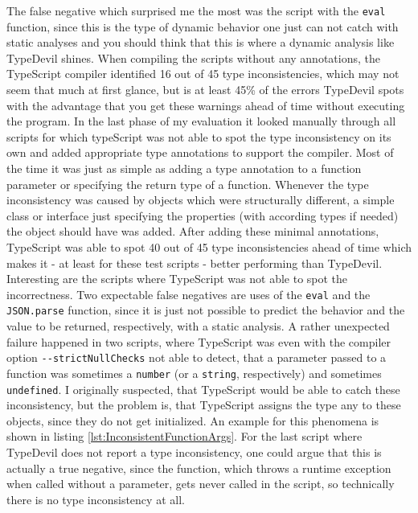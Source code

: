 \documentclass[runningheads,a4paper]{llncs}
\begin{document}
\newpage
The false negative which surprised me the most was the script with the \lstinline[columns=fixed]{eval} function, since this is the type of dynamic behavior one just can not catch with static analyses and you should think that this is where a dynamic analysis like TypeDevil shines.
When compiling the scripts without any annotations, the TypeScript compiler identified 16 out of 45 type inconsistencies, which may not seem that much at first glance, but is at least 45\% of the errors TypeDevil spots with the advantage that you get these warnings ahead of time without executing the program.
In the last phase of my evaluation it looked manually through all scripts for which typeScript was not able to spot the type inconsistency on its own and added appropriate type annotations to support the compiler.
Most of the time it was just as simple as adding a type annotation to a function parameter or specifying the return type of a function.
Whenever the type inconsistency was caused by objects which were structurally different, a simple class or interface just specifying the properties (with according types if needed) the object should have was added.
After adding these minimal annotations, TypeScript was able to spot 40 out of 45 type inconsistencies ahead of time which makes it - at least for these test scripts - better performing than TypeDevil.
Interesting are the scripts where TypeScript was not able to spot the incorrectness.
Two expectable false negatives are uses of the \lstinline[columns=fixed]{eval} and the \lstinline[columns=fixed]{JSON.parse} function, since it is just not possible to predict the behavior and the value to be returned, respectively, with a static analysis.
A rather unexpected failure happened in two scripts, where TypeScript was even with the compiler option \lstinline[columns=fixed]{--strictNullChecks} not able to detect, that a parameter passed to a function was sometimes a \lstinline[columns=fixed]{number} (or a \lstinline[columns=fixed]{string}, respectively) and sometimes \lstinline[columns=fixed]{undefined}.
I originally suspected, that TypeScript would be able to catch these inconsistency, but the problem is, that TypeScript assigns the type any to these objects, since they do not get initialized.
An example for this phenomena is shown in listing \ref{lst:InconsistentFunctionArgs}.
For the last script where TypeDevil does not report a type inconsistency, one could argue that this is actually a true negative, since the function, which throws a runtime exception when called without a parameter, gets never called in the script, so technically there is no type inconsistency at all.
\end{document}
